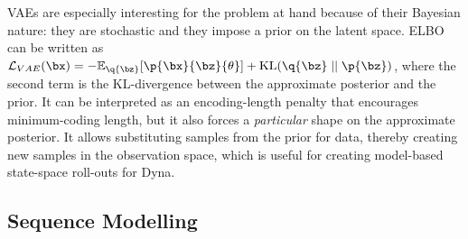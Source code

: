        VAEs are especially interesting for the problem at hand because of their Bayesian nature: they are stochastic and they impose a prior on the latent space. ELBO can be written as $\loss[VAE]{\bx} = -\expc{ \p{\bx}{\bz}{\theta} }{}{\q{\bz} } + \kl{ \q{\bz} }{ \p{\bz} }$, where the second term is the KL-divergence between the approximate posterior and the prior. It can be interpreted as an encoding-length penalty that encourages minimum-coding length, but it also forces a \emph{particular} shape on the approximate posterior. It allows substituting samples from the prior for data, thereby creating new samples in the observation space, which is useful for creating model-based state-space roll-outs for Dyna.
%
%
    \subsection{Sequence Modelling}
    \label{sec:seq_model}
    
